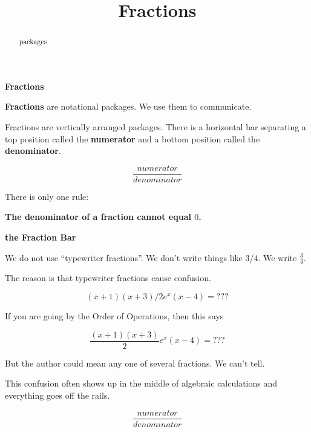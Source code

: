 \documentclass{ximera}
\title{Fractions}
\begin{document}
\begin{abstract}
packages
\end{abstract}
\maketitle



\begin{definition}  \textbf{\textcolor{green!50!black}{Fractions}} 


\textbf{Fractions} are notational packages.  We use them to communicate.


Fractions are vertically arranged packages.  There is a horizontal bar separating a top position called the \textbf{numerator} and a bottom position called the \textbf{denominator}.



\[
\frac{numerator}{denominator}
\]


There is only one rule:

\begin{center}
\textbf{\textcolor{red!70!black}{The denominator of a fraction cannot equal $0$.}}
\end{center}


\end{definition}






\begin{warning} \textbf{\textcolor{red!70!black}{the Fraction Bar}}

We do not use ``typewriter fractions''.  We don't write things like 3/4.  We write $\frac{3}{4}$.


The reason is that typewriter fractions cause confusion.

\[
(x+1)(x+3)/2 e^x (x-4) = ???
\]


If you are going by the Order of Operations, then this says


\[
\frac{(x+1)(x+3)}{2} e^x (x-4) = ???
\]


But the author could mean any one of several fractions.  We can't tell.


This confusion often shows up in the middle of algebraic calculations and everything goes off the rails.




\[
\frac{numerator}{denominator}
\]


\end{warning}
\end{document}
